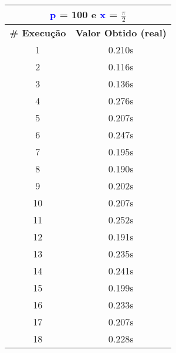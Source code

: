 \documentclass[11pt]{article}
\begin{document}
\begin{table}[!h]
\begin{center}
\begin{minipage}{0.48\textwidth}
\begin{tabular}{| c | c |}
			\multicolumn{2}{|c|}{\textbf{\textcolor{blue}{p}} = 100 e \textbf{\textcolor{blue}{x}} = $\frac{\pi}{2}$} \\ [0.2ex]
			\hline
				\textbf{\# Execução} &  \textbf{Valor Obtido (real)} \\ \hline
				1 & 0.210s \\ \hline
				2 & 0.116s \\ \hline
				3 & 0.136s \\ \hline
				4 & 0.276s \\ \hline
				5 & 0.207s \\ \hline
				6 & 0.247s \\ \hline
				7 & 0.195s \\ \hline
				8 & 0.190s \\ \hline
				9 & 0.202s \\ \hline
				10 & 0.207s \\ \hline
				11 & 0.252s \\ \hline
				12 & 0.191s \\ \hline
				13 & 0.235s \\ \hline
				14 & 0.241s \\ \hline
				15 & 0.199s \\ \hline
				16 & 0.233s \\ \hline
				17 & 0.207s \\ \hline
				18 & 0.228s \\ \hline
			\end{tabular}
		\end{minipage}
	\end{center}
\end{table}
\end{document}
